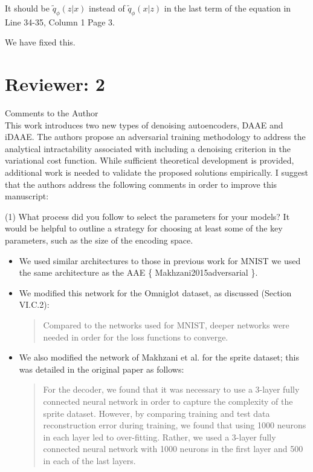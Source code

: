 \documentclass[a4paper,11pt]{article}
\begin{document}
{\color{blue}
It should be $\tilde q_\phi(z|x)$ instead of $\tilde q_\phi(x|z)$ in the last term of the equation in Line 34-35, Column 1 Page 3. }\newline

We have fixed this.

\section{Reviewer: 2}

Comments to the Author
{\color{blue}\\
This work introduces two new types of denoising autoencoders, DAAE and iDAAE. The authors propose an adversarial training methodology to address the analytical intractability associated with including a denoising criterion in the variational cost function. While sufficient theoretical development is provided, additional work is needed to validate the proposed solutions empirically. I suggest that the authors address the following comments in order to improve this manuscript:}\newline

{\color{blue}
(1) What process did you follow to select the parameters for your models? It would be helpful to outline a strategy for choosing at least some of the key parameters, such as the size of the encoding space. }\newline
\begin{itemize}
    \item We used similar architectures to those in previous work for MNIST we used the same architecture as the AAE \{ Makhzani2015adversarial \}.
    \item We modified this network for the Omniglot dataset, as discussed (Section VI.C.2):
    \begin{quote}
        Compared  to  the  networks  used  for  MNIST,  deeper networks  were  needed  in  order  for  the  loss  functions  to converge.
    \end{quote}
    \item We also modified the network of Makhzani et al. for the sprite dataset; this was detailed in the original paper as follows:
    \begin{quote}
        For  the  decoder,  we  found  that  it  was  necessary  to  use  a 3-layer  fully  connected  neural  network  in  order  to  capture the  complexity  of  the  sprite  dataset.  However,  by  comparing training and test data reconstruction error during training, we found that using 1000 neurons in each layer led to over-fitting. Rather, we used a 3-layer fully connected neural network with 1000 neurons  in  the  first  layer  and 500 in  each  of  the  last layers.
    \end{quote}
    
\end{itemize}
\end{document}
